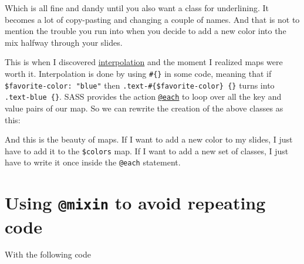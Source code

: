 \documentclass[
  letterpaper,
  DIV=11,
  numbers=noendperiod]{scrreprt}
\newenvironment{Shaded}{\begin{snugshade}}{\end{snugshade}}
\newcommand{\FunctionTok}[1]{\textcolor[rgb]{0.28,0.35,0.67}{#1}}
\newcommand{\ImportTok}[1]{\textcolor[rgb]{0.00,0.46,0.62}{#1}}
\newcommand{\KeywordTok}[1]{\textcolor[rgb]{0.00,0.23,0.31}{\textbf{#1}}}
\newcommand{\NormalTok}[1]{\textcolor[rgb]{0.00,0.23,0.31}{#1}}
\newcommand{\OperatorTok}[1]{\textcolor[rgb]{0.37,0.37,0.37}{#1}}
\newcommand{\VariableTok}[1]{\textcolor[rgb]{0.07,0.07,0.07}{#1}}
\begin{document}
Which is all fine and dandy until you also want a class for underlining.
It becomes a lot of copy-pasting and changing a couple of names. And
that is not to mention the trouble you run into when you decide to add a
new color into the mix halfway through your slides.

This is when I discovered
\href{https://sass-lang.com/documentation/interpolation/}{interpolation}
and the moment I realized maps were worth it. Interpolation is done by
using \texttt{\#\{\}} in some code, meaning that if
\texttt{\$favorite-color:\ "blue"} then
\texttt{.text-\#\{\$favorite-color\}\ \{\}} turns into
\texttt{.text-blue\ \{\}}. SASS provides the action
\href{https://sass-lang.com/documentation/at-rules/control/each/}{\texttt{@each}}
to loop over all the key and value pairs of our map. So we can rewrite
the creation of the above classes as this:

\begin{Shaded}
\end{Shaded}

And this is the beauty of maps. If I want to add a new color to my
slides, I just have to add it to the \texttt{\$colors} map. If I want to
add a new set of classes, I just have to write it once inside the
\texttt{@each} statement.

\section{\texorpdfstring{Using \texttt{@mixin} to avoid repeating
code}{Using @mixin to avoid repeating code}}\label{using-mixin-to-avoid-repeating-code}

With the following code
\end{document}
